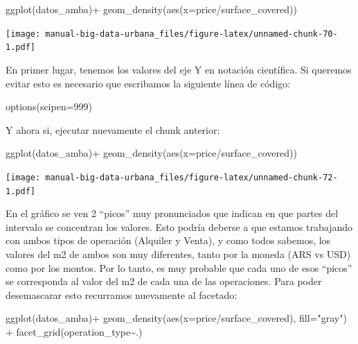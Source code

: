 \documentclass[
  spanish,
]{book}
\newenvironment{Shaded}{\begin{snugshade}}{\end{snugshade}}
\newcommand{\AttributeTok}[1]{\textcolor[rgb]{0.77,0.63,0.00}{#1}}
\newcommand{\DecValTok}[1]{\textcolor[rgb]{0.00,0.00,0.81}{#1}}
\newcommand{\FunctionTok}[1]{\textcolor[rgb]{0.00,0.00,0.00}{#1}}
\newcommand{\NormalTok}[1]{#1}
\newcommand{\SpecialCharTok}[1]{\textcolor[rgb]{0.00,0.00,0.00}{#1}}
\newcommand{\StringTok}[1]{\textcolor[rgb]{0.31,0.60,0.02}{#1}}
\begin{document}
\begin{Shaded}
\begin{Highlighting}[]
\FunctionTok{ggplot}\NormalTok{(datos\_amba)}\SpecialCharTok{+}
  \FunctionTok{geom\_density}\NormalTok{(}\FunctionTok{aes}\NormalTok{(}\AttributeTok{x=}\NormalTok{price}\SpecialCharTok{/}\NormalTok{surface\_covered))}
\end{Highlighting}
\end{Shaded}

\texttt{[image: manual-big-data-urbana\_files/figure-latex/unnamed-chunk-70-1.pdf]}

En primer lugar, tenemos los valores del eje Y en notación científica. Si queremos evitar esto es necesario que escribamos la siguiente línea de código:

\begin{Shaded}
\begin{Highlighting}[]
\FunctionTok{options}\NormalTok{(}\AttributeTok{scipen=}\DecValTok{999}\NormalTok{)}
\end{Highlighting}
\end{Shaded}

Y ahora si, ejecutar nuevamente el chunk anterior:

\begin{Shaded}
\begin{Highlighting}[]
\FunctionTok{ggplot}\NormalTok{(datos\_amba)}\SpecialCharTok{+}
  \FunctionTok{geom\_density}\NormalTok{(}\FunctionTok{aes}\NormalTok{(}\AttributeTok{x=}\NormalTok{price}\SpecialCharTok{/}\NormalTok{surface\_covered))}
\end{Highlighting}
\end{Shaded}

\texttt{[image: manual-big-data-urbana\_files/figure-latex/unnamed-chunk-72-1.pdf]}

En el gráfico se ven 2 ``picos'' muy pronunciados que indican en que partes del intervalo se concentran los valores. Esto podría deberse a que estamos trabajando con ambos tipos de operación (Alquiler y Venta), y como todos sabemos, los valores del m2 de ambos son muy diferentes, tanto por la moneda (ARS vs USD) como por los montos.
Por lo tanto, es muy probable que cada uno de esos ``picos'' se corresponda al valor del m2 de cada una de las operaciones. Para poder desemascarar esto recurramos nuevamente al facetado:

\begin{Shaded}
\begin{Highlighting}[]
\FunctionTok{ggplot}\NormalTok{(datos\_amba)}\SpecialCharTok{+}
  \FunctionTok{geom\_density}\NormalTok{(}\FunctionTok{aes}\NormalTok{(}\AttributeTok{x=}\NormalTok{price}\SpecialCharTok{/}\NormalTok{surface\_covered), }\AttributeTok{fill=}\StringTok{"gray"}\NormalTok{) }\SpecialCharTok{+}
  \FunctionTok{facet\_grid}\NormalTok{(operation\_type}\SpecialCharTok{\textasciitilde{}}\NormalTok{.)}
\end{Highlighting}
\end{Shaded}
\end{document}
